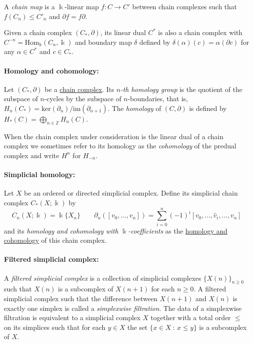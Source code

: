 \documentclass{article}
\begin{document}
	A \textit{chain map} is a $\Bbbk$-linear map $f : C \to C'$ between chain complexes such that $f(C_n) \leq C'_n$ and $\partial f = f \partial$.
	
	Given a chain complex $(C_*, \partial)$, its linear dual $C^*$ is also a chain complex with $C^{-n} = \mathrm{Hom_\Bbbk}(C_n, \Bbbk)$ and boundary map $\delta$ defined by $\delta(\alpha)(c) = \alpha(\partial c)$ for any $\alpha \in C^*$ and $c \in C_*$.
	
	\paragraph{Homology and cohomology:} Let $(C_*, \partial)$ be a \underline{chain complex}. Its \textit{$n$-th homology group} is the quotient of the subspace of $n$-cycles by the subspace of $n$-boundaries, that is, $H_n(C_*) = \mathrm{ker}(\partial_n)/ \mathrm{im}(\partial_{n+1})$. The \textit{homology} of $(C, \partial)$ is defined by $H_*(C) = \bigoplus_{n \in \mathbb Z} H_n(C)$.
	
	When the chain complex under consideration is the linear dual of a chain complex we sometimes refer to its homology as the \textit{cohomology} of the predual complex and write $H^n$ for $H_{-n}$.
	
	\paragraph{Simplicial homology:} Let $X$ be an ordered or directed simplicial complex. Define its simplicial chain complex $C_*(X; \Bbbk)$ by 
	$$
	C_n(X; \Bbbk) = \Bbbk\{X_n\} \qquad \partial_n([v_0, \dots, v_n]) = \sum_{i=0}^{n} (-1)^i [v_0, \dots, \widehat v_i, \dots, v_n]
	$$
	and its \textit{homology and cohomology with $\Bbbk$-coefficients} as the \underline{homology and cohomology} of this chain complex.
	
	\paragraph{Filtered simplicial complex:} A \textit{filtered simplicial complex} is a collection of simplicial complexes $\{X(n)\}_{n \geq 0}$ such that $X(n)$ is a subcomplex of $X(n+1)$ for each $n \geq 0$. A filtered simplicial complex such that the difference between $X(n+1)$ and $X(n)$ is exactly one simplex is called a \textit{simplexwise filtration}. The data of a simplexwise filtration is equivalent to a simplicial complex $X$ together with a total order $\leq$ on its simplices such that for each $y \in X$ the set $\{x \in X\ :\ x \leq y\}$ is a subcomplex of $X$.
	
\end{document}
